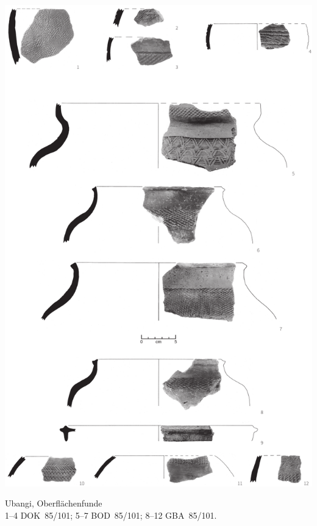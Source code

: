 \begin{pl}[H]
	\includegraphics{plt/Taf23.pdf}
	\vspace{.75em}\caption{\mbox{Ubangi}, Oberflächenfunde \\ 1--4 DOK~85/101; 5--7 BOD~85/101; 8--12 GBA~85/101.}
	\label{pl:23}
\end{pl}

